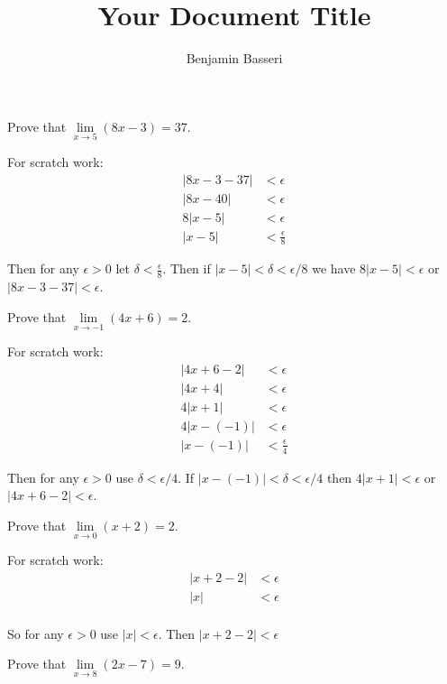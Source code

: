 \documentclass{article}
\title{Your Document Title}
\author{Benjamin Basseri}
\begin{document}
\maketitle
\begin{problem}
Prove that $\lim\limits_{x\to 5} (8x - 3) = 37$.
\end{problem}

For scratch work:
\begin{align*}
  |8x - 3 - 37| & < \epsilon           \\
  |8x -40 |     & < \epsilon           \\
  8|x - 5|      & < \epsilon           \\
  |x - 5|       & < \frac{\epsilon}{8}
\end{align*}

Then for any $\epsilon > 0$ let $\delta < \frac{\epsilon}{8}$. Then if $|x - 5 | < \delta < \epsilon/8$ we have $8|x - 5| < \epsilon$ or $|8x - 3 - 37| < \epsilon$.

\begin{problem}
Prove that $\lim\limits_{x \to -1} (4x + 6) = 2$.
\end{problem}


For scratch work:
\begin{align*}
  |4x + 6 - 2| & < \epsilon           \\
  |4x + 4|     & < \epsilon           \\
  4|x + 1|     & < \epsilon           \\
  4|x - (-1)|  & < \epsilon           \\
  |x - (-1)|   & < \frac{\epsilon}{4}
\end{align*}

Then for any $\epsilon > 0$ use $\delta < \epsilon / 4$. If $|x - (-1)| < \delta < \epsilon / 4$ then $4|x + 1| < \epsilon$ or $|4x + 6 - 2| < \epsilon$.

\begin{problem}
Prove that $\lim\limits_{x\to 0}(x + 2) = 2$.
\end{problem}

For scratch work:
\begin{align*}
  |x + 2 - 2| & < \epsilon \\
  |x|         & < \epsilon \\
\end{align*}

So for any $\epsilon > 0$ use $|x| < \epsilon$. Then $|x + 2 - 2| < \epsilon$

\begin{problem}
Prove that $\lim\limits_{x \to 8} (2x - 7) = 9$.
\end{problem}
\end{document}
